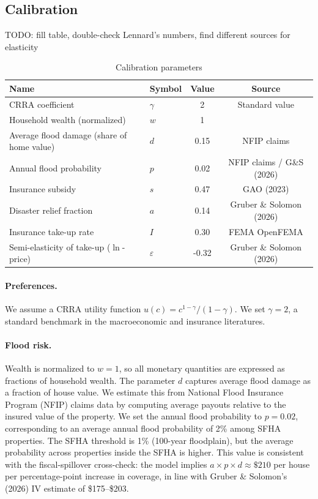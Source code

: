 \documentclass[12pt]{article}
\begin{document}
\subsection{Calibration}

TODO: fill table, double-check Lennard's numbers, find different sources for elasticity

\begin{table}[h!]
\centering
\caption{Calibration parameters}
\label{tab:calibration}
\small
\begin{tabular}{llcc}
\toprule
Name & Symbol & Value & Source \\
\midrule \midrule
CRRA coefficient & $\gamma$ & 2 & Standard value\\
\midrule
Household wealth (normalized) & $w$ & 1 & \\
Average flood damage (share of home value) & $d$ & 0.15 & NFIP claims \\
Annual flood probability & $p$ & 0.02 & NFIP claims / G\&S (2026) \\
\midrule
Insurance subsidy & $s$ & 0.47 & GAO (2023) \\
Disaster relief fraction & $a$ & 0.14 & Gruber \& Solomon (2026) \\
\midrule
Insurance take-up rate & $I$ & 0.30 & FEMA OpenFEMA \\
Semi-elasticity of take-up ($\ln$-price) & $\varepsilon$ & -0.32 & Gruber \& Solomon (2026) \\
\bottomrule
\end{tabular}
\end{table}

\paragraph{Preferences.}
We assume a CRRA utility function $u(c)=c^{1-\gamma}/(1-\gamma)$. We set $\gamma=2$, a standard benchmark in the macroeconomic and insurance literatures.

\paragraph{Flood risk.}
Wealth is normalized to $w=1$, so all monetary quantities are expressed as fractions of household wealth. The parameter $d$ captures average flood damage as a fraction of house value. We estimate this from National Flood Insurance Program (NFIP) claims data by computing average payouts relative to the insured value of the property.
We set the annual flood probability to $p=0.02$, corresponding to an average annual flood probability of 2\% among SFHA properties. The SFHA threshold is 1\% (100-year floodplain), but the average probability across properties inside the SFHA is higher. This value is consistent with the fiscal-spillover cross-check: the model implies $a \times p \times d \approx \$210$ per house per percentage-point increase in coverage, in line with Gruber \& Solomon's (2026) IV estimate of \$175--\$203.
\end{document}
